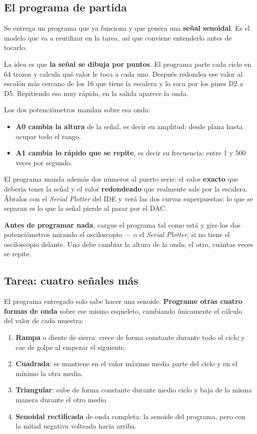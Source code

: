\documentclass[11pt,a4paper]{article}
\begin{document}
\subsection{El programa de partida}
Se entrega un programa que ya funciona y que genera una \textbf{señal senoidal}. Es el
modelo que va a reutilizar en la tarea, así que conviene entenderlo antes de tocarlo.

La idea es que \textbf{la señal se dibuja por puntos}. El programa parte cada ciclo en
\num{64} trozos y calcula qué valor le toca a cada uno. Después redondea ese valor al
escalón más cercano de los \num{16} que tiene la escalera y lo saca por los pines D2 a
D5. Repitiendo eso muy rápido, en la salida aparece la onda.

Los dos potenciómetros mandan sobre esa onda:

\begin{itemize}
    \item \textbf{A0 cambia la altura} de la señal, es decir su amplitud: desde plana
          hasta ocupar todo el rango.
    \item \textbf{A1 cambia lo rápido que se repite}, es decir su frecuencia: entre
          \num{1} y \num{500} veces por segundo.
\end{itemize}

El programa manda además dos números al puerto serie: el valor \textbf{exacto} que
debería tener la señal y el valor \textbf{redondeado} que realmente sale por la
escalera. Ábralos con el \emph{Serial Plotter} del IDE y verá las dos curvas
superpuestas: lo que se separan es lo que la señal pierde al pasar por el DAC.

\noindent\textbf{Antes de programar nada}, cargue el programa tal como está y gire los
dos potenciómetros mirando el osciloscopio --- o el \emph{Serial Plotter}, si no tiene
el osciloscopio delante. Uno debe cambiar la altura de la onda; el otro, cuántas veces
se repite.

\subsection{Tarea: cuatro señales más}
El programa entregado solo sabe hacer una senoide. \textbf{Programe otras cuatro formas
de onda} sobre ese mismo esqueleto, cambiando únicamente el cálculo del valor de cada
muestra:

\begin{enumerate}[label=\textbf{\alph*)}, leftmargin=*, labelsep=0.6em]
    \item \textbf{Rampa} o diente de sierra: crece de forma constante durante todo el
          ciclo y cae de golpe al empezar el siguiente.
    \item \textbf{Cuadrada}: se mantiene en el valor máximo media parte del ciclo y en
          el mínimo la otra media.
    \item \textbf{Triangular}: sube de forma constante durante medio ciclo y baja de la
          misma manera durante el otro medio.
    \item \textbf{Senoidal rectificada} de onda completa: la senoide del programa, pero
          con la mitad negativa volteada hacia arriba.
\end{enumerate}
\end{document}
